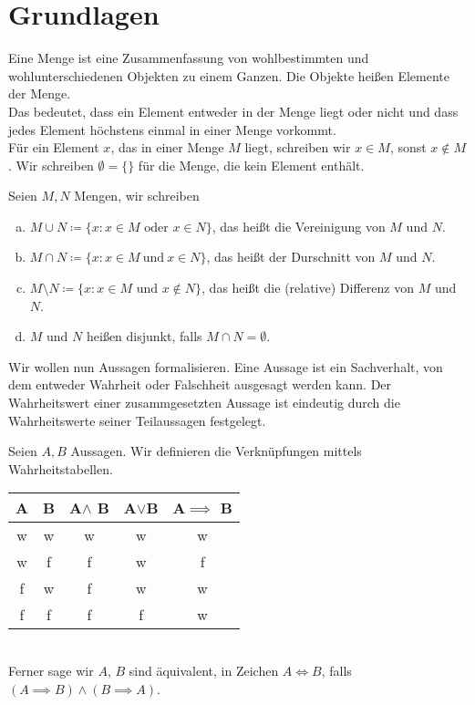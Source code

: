 \section{Grundlagen}
    \begin{defn}[Cantor 1895] Eine Menge ist eine Zusammenfassung
        von wohlbestimmten und wohlunterschiedenen Objekten zu einem Ganzen. Die Objekte
        heißen Elemente der Menge. \\
        Das bedeutet, dass ein Element entweder in der Menge liegt oder nicht und dass jedes 
        Element höchstens einmal in einer Menge vorkommt. \\
        Für ein Element $x$, das in einer Menge $M$ liegt, schreiben wir $x\in M$, sonst $x\notin M$. Wir schreiben
        $\emptyset=\{\}$ für die Menge, die kein Element enthält.
    \end{defn}
    \begin{defn}
        Seien $M,N$ Mengen, wir schreiben
        \begin{enumerate}[(a)]
            \item $M\cup N\coloneqq \{x:x\in M \text{ oder } x\in N\}$, das heißt die Vereinigung von $M$ und $N$.
            \item $M\cap N\coloneqq \{ x:x\in M \ \text{und} \ x\in N\}$, das heißt der Durschnitt von $M$ und $N$.
            \item $M\setminus N\coloneqq \{ x: x\in M \text{ und } x\notin N\}$, das heißt die (relative) Differenz von $M$ und $N$.
            \item $M$ und $N$ heißen disjunkt, falls $M\cap N=\emptyset$.
        \end{enumerate}
    \end{defn}
    Wir wollen nun Aussagen formalisieren. Eine Aussage ist ein Sachverhalt, von dem entweder Wahrheit oder Falschheit ausgesagt werden kann. Der Wahrheitswert
    einer zusammgesetzten Aussage ist eindeutig durch die Wahrheitswerte seiner Teilaussagen festgelegt. 
    \begin{defn}[Aussagen] Seien $A,B$ Aussagen. Wir definieren die Verknüpfungen mittels Wahrheitstabellen. 
    \begin{table}[!ht]
        \centering
        \begin{tabular}{ccccc}\toprule
            A & B & A$\land$ B & A$\lor$B & A$\implies$ B \\ \midrule 
            w & w & w & w & w \\ 
            w & f & f & w & f \\
            f & w & f & w & w \\
            f & f & f & f & w \\ \bottomrule
        \end{tabular}
    \end{table}
    \\ Ferner sage wir $A$, $B$ sind äquivalent, in Zeichen $A\Leftrightarrow B$, falls $(A\implies B) \land (B\implies A)$.
    \end{defn}
